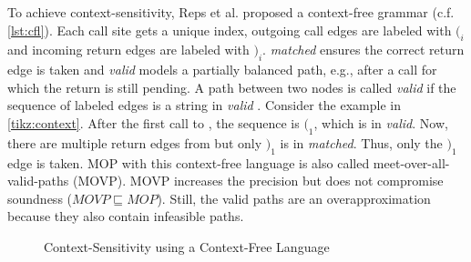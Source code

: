 \documentclass[../draft.tex]{subfiles}
\begin{document}
    To achieve context-sensitivity, Reps et al. proposed a context-free grammar (c.f. \autoref{lst:cfl}).
    Each call site gets a unique index, outgoing call edges are labeled with $(_i$ and incoming return edges are labeled with $)_i$.
    \textit{matched} ensures the correct return edge is taken and \textit{valid} models a partially balanced path, e.g., after a call for which the return is still pending.
    A path between two nodes is called \textit{valid} if the sequence of labeled edges is a string in \textit{valid} \cite{Reps1995}.
    Consider the example in \autoref{tikz:context}.
    After the first call to , the sequence is $(_1$, which is in \textit{valid}.
    Now, there are multiple return edges from  but only $)_1$ is in \textit{matched}.
    Thus, only the $)_1$ edge is taken.
    MOP with this context-free language is also called meet-over-all-valid-paths (MOVP). MOVP increases the precision but does not compromise soundness ($\mathit{MOVP} \sqsubseteq \mathit{MOP}$).
    Still, the valid paths are an overapproximation because they also contain infeasible paths.

    \begin{figure}[ht]
        \centering
        \caption{Context-Sensitivity using a Context-Free Language}
        \label{tikz:context}
    \end{figure}
\end{document}
